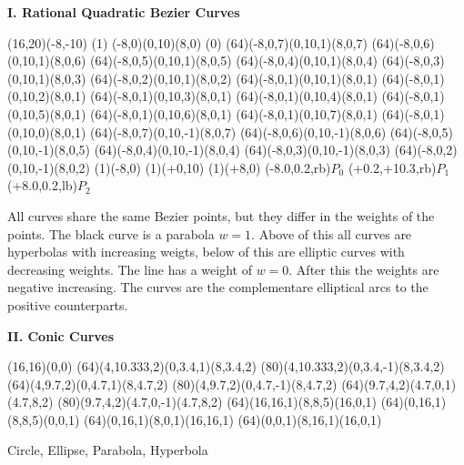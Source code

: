 


\begin{center}
{\Huge \bf{I. Rational Quadratic Bezier Curves}}
\bigskip

\begin{lapdf}(16,20)(-8,-10)
 \Dgray
 \Dash(1)
 \Polygon(-8,0)(0,10)(8,0) \Stroke
 \Dash(0)
 \Red
 \Rcurve(64)(-8,0,7)(0,10,1)(8,0,7) \Stroke
 \Green
 \Rcurve(64)(-8,0,6)(0,10,1)(8,0,6) \Stroke
 \Blue
 \Rcurve(64)(-8,0,5)(0,10,1)(8,0,5) \Stroke
 \Cyan
 \Rcurve(64)(-8,0,4)(0,10,1)(8,0,4) \Stroke
 \Magenta
 \Rcurve(64)(-8,0,3)(0,10,1)(8,0,3) \Stroke
 \Yellow
 \Rcurve(64)(-8,0,2)(0,10,1)(8,0,2) \Stroke
 \Black
 \Rcurve(64)(-8,0,1)(0,10,1)(8,0,1) \Stroke
 \Red
 \Rcurve(64)(-8,0,1)(0,10,2)(8,0,1) \Stroke
 \Green
 \Rcurve(64)(-8,0,1)(0,10,3)(8,0,1) \Stroke
 \Blue
 \Rcurve(64)(-8,0,1)(0,10,4)(8,0,1) \Stroke
 \Cyan
 \Rcurve(64)(-8,0,1)(0,10,5)(8,0,1) \Stroke
 \Magenta
 \Rcurve(64)(-8,0,1)(0,10,6)(8,0,1) \Stroke
 \Yellow
 \Rcurve(64)(-8,0,1)(0,10,7)(8,0,1) \Stroke
 \Black
 \Rcurve(64)(-8,0,1)(0,10,0)(8,0,1) \Stroke
 \Red
 \Rcurve(64)(-8,0,7)(0,10,-1)(8,0,7) \Stroke
 \Green
 \Rcurve(64)(-8,0,6)(0,10,-1)(8,0,6) \Stroke
 \Blue
 \Rcurve(64)(-8,0,5)(0,10,-1)(8,0,5) \Stroke
 \Cyan
 \Rcurve(64)(-8,0,4)(0,10,-1)(8,0,4) \Stroke
 \Magenta
 \Rcurve(64)(-8,0,3)(0,10,-1)(8,0,3) \Stroke
 \Yellow
 \Rcurve(64)(-8,0,2)(0,10,-1)(8,0,2) \Stroke
 \Point(1)(-8,0)
 \Point(1)(+0,10)
 \Point(1)(+8,0)
 \Text(-8.0,0.2,rb){$P_0$}
 \Text(+0.2,+10.3,rb){$P_1$}
 \Text(+8.0,0.2,lb){$P_2$}
\end{lapdf}
\end{center}
All curves share the same Bezier points, but they differ in the weights of
the points. The black curve is a parabola {$w = 1$}. Above of this all
curves are hyperbolas with increasing weigts, below of this are elliptic curves
with decreasing weights. The line has a weight of {$w = 0$}. After this
the weights are negative increasing. The curves are the complementare
elliptical arcs to the positive counterparts.

\newpage
{}

\begin{center}
{\Huge \bf{II. Conic Curves}}
\bigskip

\begin{lapdf}(16,16)(0,0)
 \Dgray
 \Rcurve(64)(4,10.333,2)(0,3.4,1)(8,3.4,2)
 \Rcurve(80)(4,10.333,2)(0,3.4,-1)(8,3.4,2) \Stroke
 \Red
 \Rcurve(64)(4,9.7,2)(0,4.7,1)(8,4.7,2)
 \Rcurve(80)(4,9.7,2)(0,4.7,-1)(8,4.7,2) \Stroke
 \Green
 \Rcurve(64)(9.7,4,2)(4.7,0,1)(4.7,8,2)
 \Rcurve(80)(9.7,4,2)(4.7,0,-1)(4.7,8,2) \Stroke
 \Blue
 \Rcurve(64)(16,16,1)(8,8,5)(16,0,1) \Stroke
 \Cyan
 \Rcurve(64)(0,16,1)(8,8,5)(0,0,1) \Stroke
 \Magenta
 \Rcurve(64)(0,16,1)(8,0,1)(16,16,1) \Stroke
 \Yellow
 \Rcurve(64)(0,0,1)(8,16,1)(16,0,1) \Stroke
\end{lapdf}

\large Circle, Ellipse, Parabola, Hyperbola
\end{center}

